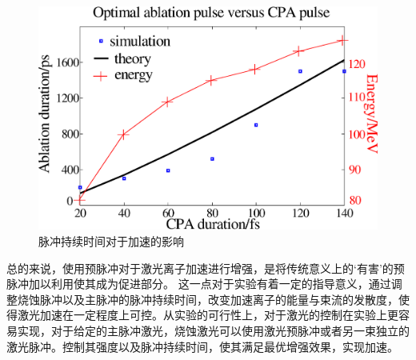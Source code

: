 \begin{figure}[!htbp]
  \centering
  \includegraphics[width=\MyFactor\textwidth]{Img/scanDuration.eps}
  \caption{脉冲持续时间对于加速的影响}
  \label{fig:scanDuration}
\end{figure}



总的来说，使用预脉冲对于激光离子加速进行增强，是将传统意义上的‘有害’的预脉冲加以利用使其成为促进部分。  这一点对于实验有着一定的指导意义，通过调整烧蚀脉冲以及主脉冲的脉冲持续时间，改变加速离子的能量与束流的发散度，使得激光加速在一定程度上可控。从实验的可行性上，对于激光的控制在实验上更容易实现，对于给定的主脉冲激光，烧蚀激光可以使用激光预脉冲或者另一束独立的激光脉冲。控制其强度以及脉冲持续时间，使其满足最优增强效果，实现加速。




